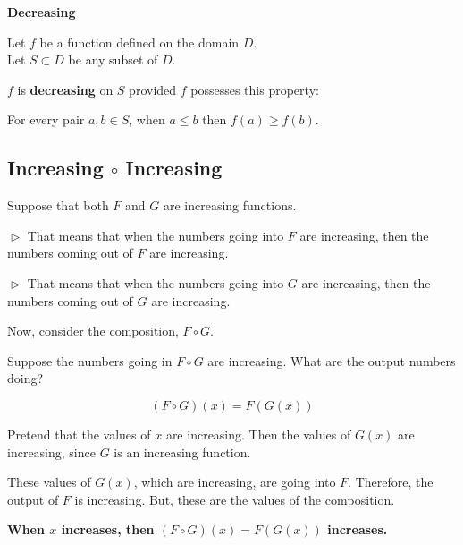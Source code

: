 \documentclass{ximera}
\begin{document}
\begin{idea}  \textbf{\textcolor{blue!55!black}{Decreasing}} 


Let $f$ be a function defined on the domain $D$. \\
Let $S \subset D$ be any subset of $D$.

$f$ is \textbf{decreasing} on $S$ provided $f$ possesses this property:  


\begin{center}
For every pair $a, b \in S$, when $a \leq b$ then $f(a) \geq f(b)$.
\end{center}

\end{idea}











\subsection*{Increasing $\circ$ Increasing}


Suppose that both $F$ and $G$ are increasing functions. 

$\vartriangleright$ That means that when the numbers going into $F$ are increasing, then the numbers coming out of $F$ are increasing. 

$\vartriangleright$ That means that when the numbers going into $G$ are increasing, then the numbers coming out of $G$ are increasing. 


Now, consider the composition, $F \circ G$. 


Suppose the numbers going in $F \circ G$ are increasing.  What are the output numbers doing? 




\[ (F \circ G)(x) = F(G(x)) \]


Pretend that the values of $x$ are increasing. Then the values of $G(x)$ are increasing, since $G$ is an increasing function.

These values of $G(x)$, which are increasing, are going into $F$.  Therefore, the output of $F$ is increasing.  But, these are the values of the composition.



\begin{center}
\textbf{\textcolor{red!70!black}{When $x$ increases, then $(F \circ G)(x) = F(G(x))$ increases.}}
\end{center}
\end{document}
